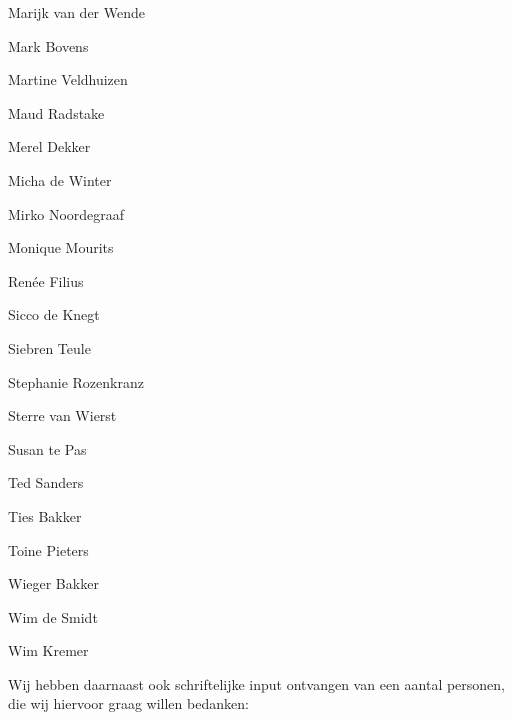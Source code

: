 \documentclass[smallauthor, chapterhaspagenum, nochapterinheader, pagenuminheader,  bigchapnum,medium2, tocpages, garamond, titleinheader]{jote-book}
\begin{document}
\begin{references}
		Marijk van der Wende



		Mark Bovens



		Martine Veldhuizen



		Maud Radstake



		Merel Dekker



		Micha de Winter



		Mirko Noordegraaf



		Monique Mourits



		Renée Filius



		Sicco de Knegt



		Siebren Teule



		Stephanie Rozenkranz



		Sterre van Wierst



		Susan te Pas



		Ted Sanders



		Ties Bakker



		Toine Pieters



		Wieger Bakker



		Wim de Smidt



		Wim Kremer


	\end{references}\clearpage\noindent Wij hebben daarnaast ook schriftelijke input ontvangen van een aantal personen, die wij hiervoor graag willen bedanken:

	\vspace*{\baselineskip}
\end{document}
